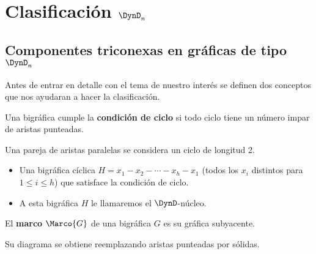 \chapter{Clasificación $\DynD_{n}$}

\section{Componentes triconexas en gráficas de tipo $\DynD_{n}$}

Antes de entrar en detalle con el tema de nuestro interés se definen dos conceptos que nos ayudaran a hacer la clasificación.

\begin{definition}
Una bigráfica cumple la \textbf{condición de ciclo} si todo ciclo tiene un número impar de aristas punteadas.
\end{definition}

\begin{example}
    \centering
\end{example}

Una pareja de aristas paralelas se considera un ciclo de longitud 2.

\begin{itemize}
  \item Una bigráfica cíclica $ H = x_{1} - x_{2} - \cdots - x_{h}-x_{1}$ (todos los $x_{i}$ distintos para $ 1 \leq i \leq h$) que satisface la condición de ciclo.
  \item A esta bigráfica $H$ le llamaremos el $\DynD$-núcleo.
\end{itemize}

\begin{definition}
El \textbf{marco} $\Marco{G}$ de una bigráfica $G$ es su gráfica subyacente.
\end{definition}
Su diagrama se obtiene reemplazando aristas punteadas por sólidas.

